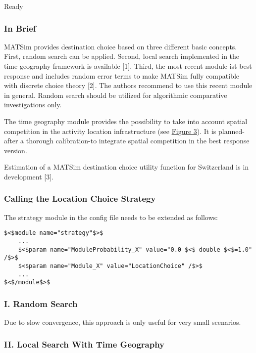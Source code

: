 \documentclass[a4paper,11pt]{report}
\begin{document}
Ready

\subsubsection{\textbf{In Brief}}

MATSim provides destination choice based on three  different basic concepts. First, random search can be applied. Second,  local search implemented in the time geography framework is available  [1]. Third, the most recent module ist best response and includes random  error terms to make MATSim fully compatible with discrete choice theory  [2]. The authors recommend to use this recent module in general. Random  search should be utilized for algorithmic comparative investigations  only.

The time geography module provides the possibility to  take into account spatial competition in the activity location  infrastructure (see \hyperlink{Figure3}{Figure 3}). It is planned-after a thorough calibration-to integrate spatial competition in the best response version.

Estimation of a MATSim destination choice utility function for Switzerland is in development [3].




\subsubsection{\textbf{Calling the Location Choice Strategy}}

The strategy module in the config file needs to be extended as follows:
\begin{verbatim}
$<$module name="strategy"$>$
    ...
    $<$param name="ModuleProbability_X" value="0.0 $<$ double $<$=1.0" /$>$
    $<$param name="Module_X" value="LocationChoice" /$>$
    ...
$<$/module$>$
\end{verbatim}


\subsubsection{\textbf{I. Random Search}}

Due to slow convergence, this approach is only useful for very small scenarios.


\subsubsection{\textbf{II. Local Search With Time Geography}}
\end{document}
